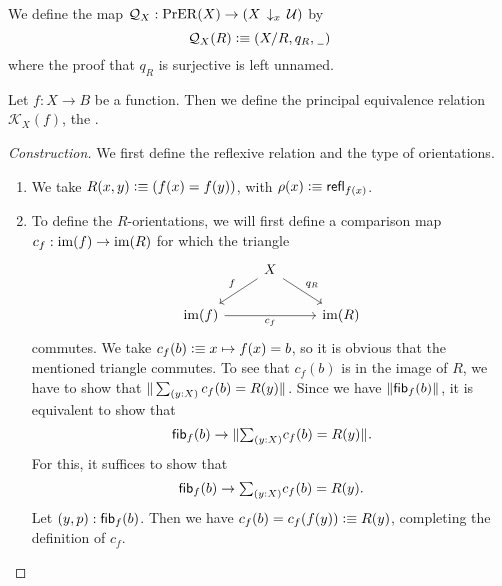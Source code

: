 \begin{defn}\label{defn:Q}
We define the map $\mathcal{Q}_X: \mathrm{PrER}(X)\to (X\,\downarrow_{x}\,\mathcal{U})$
by
\begin{equation*}
\mathcal{Q}_X(R)\vcentcolon\equiv {\mathopen{}(X/R,q_R,\mathord{\hspace{1pt}\underline{\hspace{1ex}}\hspace{1pt}})\mathclose{}}
\end{equation*}
where the proof that $q_R$ is surjective is left unnamed.
\end{defn}

\begin{defn}
Let $f:X\to B$ be a function. Then we define the principal equivalence relation $\mathcal{K}_X(f)$, the . 
\end{defn}

\begin{proof}[Construction]
We first define the reflexive relation and the type of orientations.
\begin{enumerate}
\item We take $R(x,y)\vcentcolon\equiv (f(x)=f(y))$, with $\rho(x)\vcentcolon\equiv \mathsf{refl}_{f(x)}$. 
\item To define the $R$-orientations, we will first define a comparison map $c_f : \operatorname{im}(f)\to\operatorname{im}(R)$ for which the triangle
\begin{equation}\label{eq:intro_cf}
\begin{tikzcd}
& X \arrow[dl,swap,"f"] \arrow[dr,"q_R"] \\
\im(f) \arrow[rr,swap,"c_f"] & & \im(R)
\end{tikzcd}
\end{equation}
commutes. We take $c_f(b)\vcentcolon\equiv x\mapsto f(x)=b$, so it is obvious that the mentioned triangle commutes. To see that $c_f(b)$ is in the image of $R$, we have to show that $\brck{\sm{y:X} c_f(b)=R(y)}$. Since we have $\Vert \mathsf{fib}_{f}(b)\Vert_{}$, it is equivalent to show that
\begin{equation*}
\fib{f}{b}\to\brck{\sm{y:X}c_f(b)=R(y)}.
\end{equation*}
For this, it suffices to show that
\begin{equation*}
\fib{f}{b}\to\sm{y:X}c_f(b)=R(y).
\end{equation*}
Let ${\mathopen{}(y,p)\mathclose{}}:\mathsf{fib}_{f}(b)$. Then we have $c_f(b)=c_f(f(y))\vcentcolon\equiv R(y)$, completing the definition of $c_f$. 


\end{enumerate}
\end{proof}
